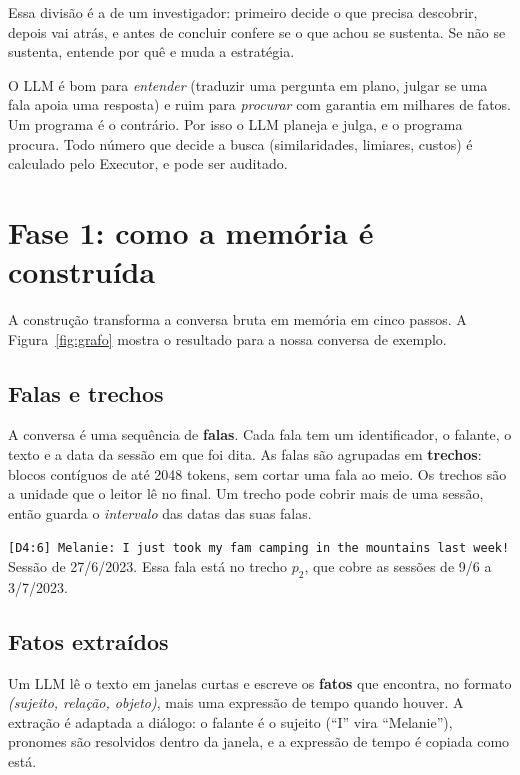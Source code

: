 \documentclass[11pt]{article}
\begin{document}
Essa divisão é a de um investigador: primeiro decide o que precisa descobrir,
depois vai atrás, e antes de concluir confere se o que achou se sustenta. Se
não se sustenta, entende por quê e muda a estratégia.

\begin{porque}
O LLM é bom para \emph{entender} (traduzir uma pergunta em plano, julgar se
uma fala apoia uma resposta) e ruim para \emph{procurar} com garantia em
milhares de fatos. Um programa é o contrário. Por isso o LLM planeja e julga,
e o programa procura. Todo número que decide a busca (similaridades, limiares,
custos) é calculado pelo Executor, e pode ser auditado.
\end{porque}

\section{Fase 1: como a memória é construída}
\label{sec:memoria}

A construção transforma a conversa bruta em memória em cinco passos. A
Figura~\ref{fig:grafo} mostra o resultado para a nossa conversa de exemplo.

\subsection{Falas e trechos}

A conversa é uma sequência de \textbf{falas}. Cada fala tem um identificador,
o falante, o texto e a data da sessão em que foi dita. As falas são agrupadas
em \textbf{trechos}: blocos contíguos de até 2048 tokens, sem cortar uma fala
ao meio. Os trechos são a unidade que o leitor lê no final. Um trecho pode
cobrir mais de uma sessão, então guarda o \emph{intervalo} das datas das suas
falas.

\begin{exemplo}
\texttt{[D4:6] Melanie: I just took my fam camping in the mountains last week!}\\
Sessão de 27/6/2023. Essa fala está no trecho $p_2$, que cobre as sessões de
9/6 a 3/7/2023.
\end{exemplo}

\subsection{Fatos extraídos}

Um LLM lê o texto em janelas curtas e escreve os \textbf{fatos} que encontra,
no formato \emph{(sujeito, relação, objeto)}, mais uma expressão de tempo
quando houver. A extração é adaptada a diálogo: o falante é o sujeito
(``I'' vira ``Melanie''), pronomes são resolvidos dentro da janela, e a
expressão de tempo é copiada como está.
\end{document}
